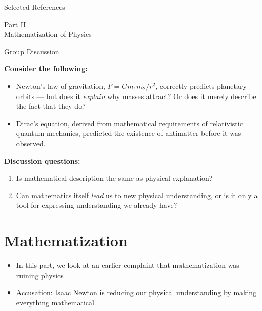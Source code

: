 \documentclass[fleqn]{beamer}
\begin{document}
\nocite{*}

\begin{frame}[allowframebreaks]{Selected References}
\printbibliography[heading=none, keyword=scientific-explanation]
\end{frame}


\begin{frame}[plain]
  \vfill
  \centering
  { Part II}\\[0.5em]
  {\large Mathematization of Physics}
  \vfill
\end{frame}

\begin{frame}{Group Discussion}

  \textbf{Consider the following:}

  \vspace{0.5em}
  \begin{itemize}
  \item Newton's law of gravitation, $F = Gm_1 m_2 / r^2$, correctly
    predicts planetary orbits --- but does it \emph{explain} why
    masses attract? Or does it merely describe the fact that they do?
  \item Dirac's equation, derived from mathematical requirements of
    relativistic quantum mechanics, predicted the existence of
    antimatter before it was observed.
  \end{itemize}

  \vspace{0.8em}
  \textbf{Discussion questions:}
  \begin{enumerate}
  \item Is mathematical description the same as physical explanation?
  \item Can mathematics itself \emph{lead} us to new physical
    understanding, or is it only a tool for expressing understanding
    we already have?
  \end{enumerate}

\end{frame}

\section{Mathematization}

\begin{frame}

  \begin{itemize}
  \item In this part, we look at an earlier complaint that
    mathematization was ruining physics
  \item Accusation: Isaac Newton is reducing our physical
    understanding by making everything mathematical
  \end{itemize}

\end{frame}
\end{document}
